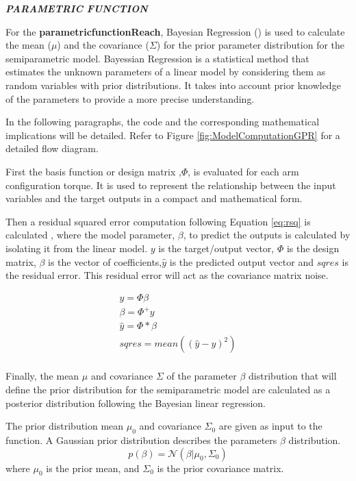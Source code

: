 \textbf{\textit{PARAMETRIC FUNCTION}}

For the \textbf{parametricfunctionReach}, Bayesian Regression (\cite{BLM}) is used to calculate the mean ($\mu$) and the covariance ($\Sigma$) for the prior parameter distribution for the semiparametric model. Bayessian Regression is a statistical method that estimates the unknown parameters of a linear model by considering them as random variables with prior distributions. It takes into account prior knowledge of the parameters to provide a more precise understanding.

In the following paragraphs, the code and the corresponding mathematical implications will be detailed.  Refer to Figure \ref{fig:ModelComputationGPR} for a detailed flow diagram.

First the basis function or design matrix ,$\Phi$, is evaluated for each arm configuration torque. It is used to represent the relationship between the input variables and the target outputs in a compact and mathematical form. 

Then a residual squared error computation following Equation \ref{eq:rsq} is calculated , where the model parameter, $\beta$, to predict the outputs is calculated by isolating it from the linear model. \( y \) is the target/output vector, \( \Phi \) is the design matrix, \( \beta \) is the vector of coefficients,\( \hat{y} \) is the predicted output vector and  \( sqres \) is the residual error. This residual error will act as the covariance matrix noise.

\begin{equation}\label{eq:rsq}
\begin{aligned}
    y = \Phi \beta \\
    \beta = \Phi^+y \\
    \hat{y} = \Phi*\beta \\
    sqres = mean((\hat{y}-y)^2) \\
\end{aligned}
\end{equation} 

Finally, the mean \( \mu \) and covariance \( \Sigma \) of the parameter $\beta$ distribution  that will define the prior distribution for the semiparametric model are calculated as a posterior distribution following the Bayesian linear regression.  

The prior distribution mean \( \mu_0 \) and covariance \( \Sigma_0 \) are given as input to the function. A Gaussian prior distribution describes the parameters \( \beta \) distribution.
\begin{equation}
  p(\beta) = \mathcal{N}(\beta | \mu_0, \Sigma_0)
\end{equation}
where \( \mu_0 \) is the prior mean, and \( \Sigma_0 \) is the prior covariance matrix.

